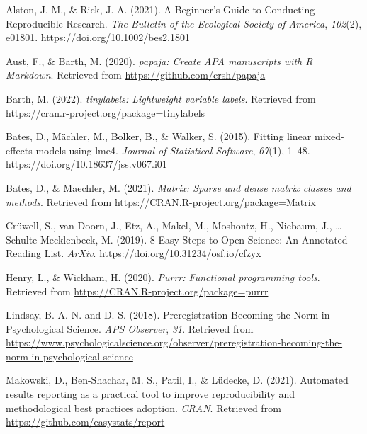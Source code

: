 \documentclass[
  man]{apa6}
\newlength{\cslhangindent}
\newlength{\cslentryspacingunit} %
\newenvironment{CSLReferences}[2] %
 {%
  \setlength{\parindent}{0pt}
  \ifodd #1
  \let\oldpar\par
  \def\par{\hangindent=\cslhangindent\oldpar}
  \fi
  \setlength{\parskip}{#2\cslentryspacingunit}
 }%
 {}
\begin{document}
\hypertarget{refs}{}
\begin{CSLReferences}{1}{0}
\leavevmode{}%
Alston, J. M., \& Rick, J. A. (2021). A {Beginner}'s {Guide} to {Conducting Reproducible Research}. \emph{The Bulletin of the Ecological Society of America}, \emph{102}(2), e01801. \url{https://doi.org/10.1002/bes2.1801}

\leavevmode{}%
Aust, F., \& Barth, M. (2020). \emph{{papaja}: {Create} {APA} manuscripts with {R Markdown}}. Retrieved from \url{https://github.com/crsh/papaja}

\leavevmode{}%
Barth, M. (2022). \emph{{tinylabels}: Lightweight variable labels}. Retrieved from \url{https://cran.r-project.org/package=tinylabels}

\leavevmode{}%
Bates, D., Mächler, M., Bolker, B., \& Walker, S. (2015). Fitting linear mixed-effects models using {lme4}. \emph{Journal of Statistical Software}, \emph{67}(1), 1--48. \url{https://doi.org/10.18637/jss.v067.i01}

\leavevmode{}%
Bates, D., \& Maechler, M. (2021). \emph{Matrix: Sparse and dense matrix classes and methods}. Retrieved from \url{https://CRAN.R-project.org/package=Matrix}

\leavevmode{}%
Crüwell, S., van Doorn, J., Etz, A., Makel, M., Moshontz, H., Niebaum, J., \ldots{} Schulte-Mecklenbeck, M. (2019). 8 {Easy Steps} to {Open Science}: {An Annotated Reading List}. \emph{ArXiv}. \url{https://doi.org/10.31234/osf.io/cfzyx}

\leavevmode{}%
Henry, L., \& Wickham, H. (2020). \emph{Purrr: Functional programming tools}. Retrieved from \url{https://CRAN.R-project.org/package=purrr}

\leavevmode{}%
Lindsay, B. A. N. and D. S. (2018). Preregistration {Becoming} the {Norm} in {Psychological Science}. \emph{APS Observer}, \emph{31}. Retrieved from \url{https://www.psychologicalscience.org/observer/preregistration-becoming-the-norm-in-psychological-science}

\leavevmode{}%
Makowski, D., Ben-Shachar, M. S., Patil, I., \& Lüdecke, D. (2021). Automated results reporting as a practical tool to improve reproducibility and methodological best practices adoption. \emph{CRAN}. Retrieved from \url{https://github.com/easystats/report}


\end{CSLReferences}
\end{document}
